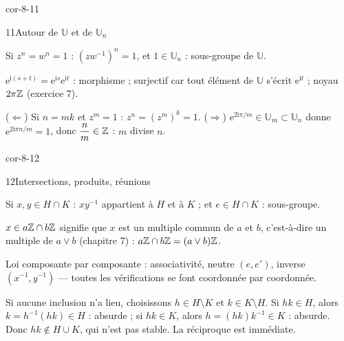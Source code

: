 \begin{blocLivre}{cor-8-11}
\begin{corrige}{11}{Autour de $\mathbb{U}$ et de $\mathbb{U}_n$}
\begin{questions}
  \item Si $z^{n}=w^{n}=1$ : $(zw^{-1})^{n}=1$, et $1\in\mathbb{U}_n$ :
    sous-groupe de $\mathbb{U}$.
  \item $\mathrm{e}^{\mathrm{i}(s+t)}=\mathrm{e}^{\mathrm{i}s}\mathrm{e}^{\mathrm{i}t}$ :
    morphisme ; surjectif car tout élément de $\mathbb{U}$ s'écrit
    $\mathrm{e}^{\mathrm{i}t}$ ; noyau $2\pi\mathbb{Z}$ (exercice 7).
  \item ($\Leftarrow$) Si $n=mk$ et $z^{m}=1$ : $z^{n}=(z^{m})^{k}=1$.
    ($\Rightarrow$) $\mathrm{e}^{2\mathrm{i}\pi/m}\in\mathbb{U}_m\subset\mathbb{U}_n$
    donne $\mathrm{e}^{2\mathrm{i}\pi n/m}=1$, donc $\dfrac{n}{m}\in\mathbb{Z}$ :
    $m$ divise $n$.
\end{questions}
\end{corrige}
\end{blocLivre}

\begin{blocLivre}{cor-8-12}
\begin{corrige}{12}{Intersections, produits, réunions}
\begin{questions}
  \item Si $x,y\in H\cap K$ : $xy^{-1}$ appartient à $H$ et à $K$ ; et
    $e\in H\cap K$ : sous-groupe.
  \item $x\in a\mathbb{Z}\cap b\mathbb{Z}$ signifie que $x$ est un multiple commun de $a$
    et $b$, c'est-à-dire un multiple de $a\vee b$ (chapitre 7) :
    $a\mathbb{Z}\cap b\mathbb{Z}=(a\vee b)\mathbb{Z}$.
  \item Loi composante par composante : associativité, neutre $(e,e')$,
    inverse $(x^{-1},y^{-1})$ — toutes les vérifications se font
    coordonnée par coordonnée.
  \item Si aucune inclusion n'a lieu, choisissons $h\in H\setminus K$ et
    $k\in K\setminus H$. Si $hk\in H$, alors $k=h^{-1}(hk)\in H$ :
    absurde ; si $hk\in K$, alors $h=(hk)k^{-1}\in K$ : absurde. Donc
    $hk\notin H\cup K$, qui n'est pas stable. La réciproque est immédiate.
\end{questions}
\end{corrige}
\end{blocLivre}


